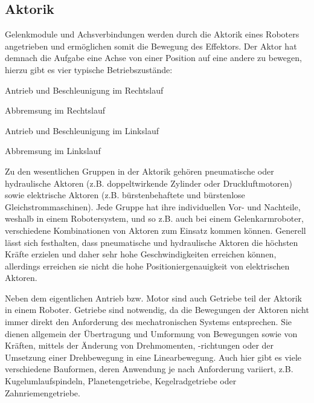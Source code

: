 \documentclass[11pt,ngerman,parskip=half]{scrartcl}
\begin{document}
\subsection{Aktorik}
\label{subsec:john_aktorik}
Gelenkmodule und Achsverbindungen werden durch die Aktorik eines Roboters
angetrieben und ermöglichen somit die Bewegung des Effektors. Der Aktor hat
demnach die Aufgabe eine Achse von einer Position auf eine andere zu bewegen,
hierzu gibt es vier typische Betriebszustände:
\begin{compactitem}
  \item Antrieb und Beschleunigung im Rechtslauf
  \item Abbremsung im Rechtslauf
  \item Antrieb und Beschleunigung im Linkslauf
  \item Abbremsung im Linkslauf
\end{compactitem}

Zu den wesentlichen Gruppen in der Aktorik gehören pneumatische oder
hydraulische Aktoren (z.B. doppeltwirkende Zylinder oder Druckluftmotoren)
sowie elektrische Aktoren (z.B. bürstenbehaftete und bürstenlose
Gleichstrommaschinen). Jede Gruppe hat ihre individuellen Vor- und Nachteile,
weshalb in einem Robotersystem, und so z.B. auch bei einem Gelenkarmroboter,
verschiedene Kombinationen von Aktoren zum Einsatz kommen können. Generell
lässt sich festhalten, dass pneumatische und hydraulische Aktoren die
höchsten Kräfte erzielen und daher sehr hohe Geschwindigkeiten erreichen
können, allerdings erreichen sie nicht die hohe Positioniergenauigkeit von
elektrischen Aktoren.
\parencite[vgl.][63--79]{hesse_taschenbuch_2016}

Neben dem eigentlichen Antrieb bzw. Motor sind auch Getriebe teil der Aktorik
in einem Roboter. Getriebe sind notwendig, da die Bewegungen der Aktoren
nicht immer direkt den Anforderung des mechatronischen Systems entsprechen.
Sie dienen allgemein der Übertragung und Umformung von Bewegungen sowie von
Kräften, mittels der Änderung von Drehmomenten, -richtungen oder der
Umsetzung einer Drehbewegung in eine Linearbewegung. Auch hier gibt es viele
verschiedene Bauformen, deren Anwendung je nach Anforderung variiert, z.B.
Kugelumlaufspindeln, Planetengetriebe, Kegelradgetriebe oder Zahnriemengetriebe.
\parencites[vgl.][121\psq]{maccloy_robotertechnik:_1989}
[][89--96]{hesse_taschenbuch_2016}
\end{document}
